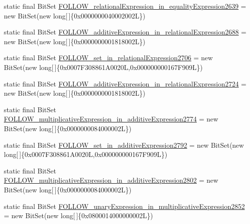 \begin{DoxyCompactItemize}
\item 
static final Bit\-Set \hyperlink{classorg_1_1tzi_1_1use_1_1parser_1_1soil_1_1_soil_parser_a88891bb0d5f0192723022842029fe35e}{F\-O\-L\-L\-O\-W\-\_\-relational\-Expression\-\_\-in\-\_\-equality\-Expression2639} = new Bit\-Set(new long\mbox{[}$\,$\mbox{]}\{0x0000000040002002\-L\})
\item 
static final Bit\-Set \hyperlink{classorg_1_1tzi_1_1use_1_1parser_1_1soil_1_1_soil_parser_a743a6e890f939c204d3ba83df3c9871a}{F\-O\-L\-L\-O\-W\-\_\-additive\-Expression\-\_\-in\-\_\-relational\-Expression2688} = new Bit\-Set(new long\mbox{[}$\,$\mbox{]}\{0x0000000001818002\-L\})
\item 
static final Bit\-Set \hyperlink{classorg_1_1tzi_1_1use_1_1parser_1_1soil_1_1_soil_parser_a46888c7870fef153e89c8a17d6fee0f9}{F\-O\-L\-L\-O\-W\-\_\-set\-\_\-in\-\_\-relational\-Expression2706} = new Bit\-Set(new long\mbox{[}$\,$\mbox{]}\{0x0007\-F308861\-A0020\-L,0x000000000167\-F909\-L\})
\item 
static final Bit\-Set \hyperlink{classorg_1_1tzi_1_1use_1_1parser_1_1soil_1_1_soil_parser_a5119c4f293b2849bd4901fcfc0c1327e}{F\-O\-L\-L\-O\-W\-\_\-additive\-Expression\-\_\-in\-\_\-relational\-Expression2724} = new Bit\-Set(new long\mbox{[}$\,$\mbox{]}\{0x0000000001818002\-L\})
\item 
static final Bit\-Set \hyperlink{classorg_1_1tzi_1_1use_1_1parser_1_1soil_1_1_soil_parser_aee88fc700f256f2022d8aa120012a9c5}{F\-O\-L\-L\-O\-W\-\_\-multiplicative\-Expression\-\_\-in\-\_\-additive\-Expression2774} = new Bit\-Set(new long\mbox{[}$\,$\mbox{]}\{0x0000000084000002\-L\})
\item 
static final Bit\-Set \hyperlink{classorg_1_1tzi_1_1use_1_1parser_1_1soil_1_1_soil_parser_a7a98ac7b9a586d0d9d586b8439479eb6}{F\-O\-L\-L\-O\-W\-\_\-set\-\_\-in\-\_\-additive\-Expression2792} = new Bit\-Set(new long\mbox{[}$\,$\mbox{]}\{0x0007\-F308861\-A0020\-L,0x000000000167\-F909\-L\})
\item 
static final Bit\-Set \hyperlink{classorg_1_1tzi_1_1use_1_1parser_1_1soil_1_1_soil_parser_adad5f7847741f878c4450f220a692c7d}{F\-O\-L\-L\-O\-W\-\_\-multiplicative\-Expression\-\_\-in\-\_\-additive\-Expression2802} = new Bit\-Set(new long\mbox{[}$\,$\mbox{]}\{0x0000000084000002\-L\})
\item 
static final Bit\-Set \hyperlink{classorg_1_1tzi_1_1use_1_1parser_1_1soil_1_1_soil_parser_ace8745ba341ccb31ccaa5a76761f13c0}{F\-O\-L\-L\-O\-W\-\_\-unary\-Expression\-\_\-in\-\_\-multiplicative\-Expression2852} = new Bit\-Set(new long\mbox{[}$\,$\mbox{]}\{0x0800014000000002\-L\})

\end{DoxyCompactItemize}
